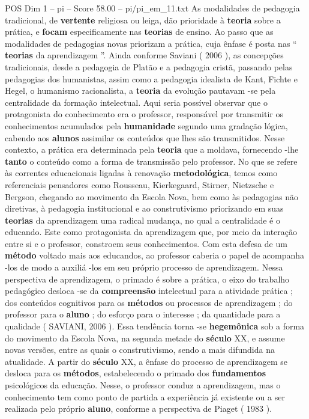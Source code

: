 \begin{textsample}{POS Dim 1 – pi – Score 58.00 – pi/pi\_em\_11.txt}
As modalidades de pedagogia tradicional, de \textbf{vertente} religiosa ou leiga, dão prioridade à \textbf{teoria} sobre a prática, e \textbf{focam} especificamente nas \textbf{teorias} de ensino.
Ao passo que as modalidades de pedagogias novas priorizam a prática, cuja ênfase é posta nas “ \textbf{teorias} da aprendizagem ”.
Ainda conforme Saviani ( 2006 ), as concepções tradicionais, desde a pedagogia de Platão e a pedagogia cristã, passando pelas pedagogias dos humanistas, assim como a pedagogia idealista de Kant, Fichte e Hegel, o humanismo racionalista, a \textbf{teoria} da evolução pautavam -se pela centralidade da formação intelectual.
Aqui seria possível observar que o protagonista do conhecimento era o professor, responsável por transmitir os conhecimentos acumulados pela \textbf{humanidade} segundo uma gradação lógica, cabendo aos \textbf{alunos} assimilar os conteúdos que lhes são transmitidos.
Nesse contexto, a prática era determinada pela \textbf{teoria} que a moldava, fornecendo -lhe \textbf{tanto} o conteúdo como a forma de transmissão pelo professor.
No que se refere às correntes educacionais ligadas à renovação \textbf{metodológica}, temos como referenciais pensadores como Rousseau, Kierkegaard, Stirner, Nietzsche e Bergson, chegando ao movimento da Escola Nova, bem como às pedagogias não diretivas, à pedagogia institucional e ao construtivismo priorizando em suas \textbf{teorias} da aprendizagem uma radical mudança, no qual a centralidade é o educando.
Este como protagonista da aprendizagem que, por meio da interação entre si e o professor, constroem seus conhecimentos.
Com esta defesa de um \textbf{método} voltado mais aos educandos, ao professor caberia o papel de acompanha -los de modo a auxiliá -los em seu próprio processo de aprendizagem.
Nessa perspectiva de aprendizagem, o primado é sobre a prática, o eixo do trabalho pedagógico desloca -se da \textbf{compreensão} intelectual para a atividade prática ; dos conteúdos cognitivos para os \textbf{métodos} ou processos de aprendizagem ; do professor para o \textbf{aluno} ; do esforço para o interesse ; da quantidade para a qualidade ( SAVIANI, 2006 ).
Essa tendência torna -se \textbf{hegemônica} sob a forma do movimento da Escola Nova, na segunda metade do \textbf{século} XX, e assume novas versões, entre as quais o construtivismo, sendo a mais difundida na atualidade.
A partir do \textbf{século} XX, a ênfase do processo de aprendizagem se desloca para os \textbf{métodos}, estabelecendo o primado dos \textbf{fundamentos} psicológicos da educação.
Nesse, o professor conduz a aprendizagem, mas o conhecimento tem como ponto de partida a experiência já existente ou a ser realizada pelo próprio \textbf{aluno}, conforme a perspectiva de Piaget ( 1983 ).

\end{textsample}

